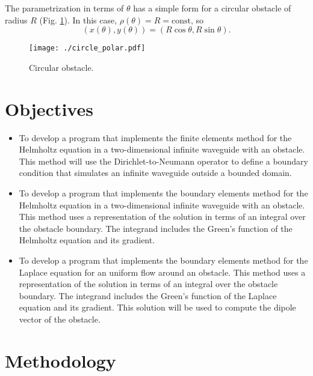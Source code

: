 \documentclass[11pt]{article}
\begin{document}
The parametrization in terms of $\theta$ has a simple form for a circular obstacle of radius $R$ (Fig. \ref{fig:circle_polar}). In this case, $\rho(\theta) = R = \mathrm{const}$, so
\begin{equation}
  \label{eq:40}
  (x(\theta), y(\theta)) = (R\cos\theta, R\sin\theta).
\end{equation}
\begin{figure}[h]
  \centering
  \texttt{[image: ./circle\_polar.pdf]}
  \caption{Circular obstacle.}
  \label{fig:circle_polar}
\end{figure}




\section{Objectives}
\begin{itemize}
\item To develop a program that implements the finite elements method for the Helmholtz equation in a two-dimensional infinite waveguide with an obstacle. This method will use the Dirichlet-to-Neumann operator to define a boundary condition that simulates an infinite waveguide outside a bounded domain.
  
\item To develop a program that implements the boundary elements method for the Helmholtz equation in a two-dimensional infinite waveguide with an obstacle. This method uses a representation of the solution in terms of an integral over the obstacle boundary. The integrand includes the Green's function of the Helmholtz equation and its gradient.

\item To develop a program that implements the boundary elements method for the Laplace equation for an uniform flow around an obstacle. This method uses a representation of the solution in terms of an integral over the obstacle boundary. The integrand includes the Green's function of the Laplace equation and its gradient. This solution will be used to compute the  dipole vector of the obstacle.
\end{itemize}

\section{Methodology}
\end{document}
